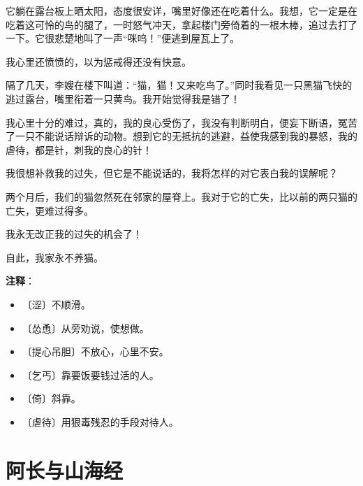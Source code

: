 \documentclass[12pt,UTF-8,openany]{ctexbook}
\begin{document}
\begin{large}
    它躺在露台板上晒太阳，态度很安详，嘴里好像还在吃着什么。我想，它一定是在吃着这可怜的鸟的腿了，一时怒气冲天，拿起楼门旁倚着的一根木棒，追过去打了一下。它很悲楚地叫了一声“咪呜！”便逃到屋瓦上了。
    
    我心里还愤愤的，以为惩戒得还没有快意。
    
    隔了几天，李嫂在楼下叫道：“猫，猫！又来吃鸟了。”同时我看见一只黑猫飞快的逃过露台，嘴里衔着一只黄鸟。我开始觉得我是错了！
    
    我心里十分的难过，真的，我的良心受伤了，我没有判断明白，便妄下断语，冤苦了一只不能说话辩诉的动物。想到它的无抵抗的逃避，益使我感到我的暴怒，我的虐待，都是针，刺我的良心的针！
    
    我很想补救我的过失，但它是不能说话的，我将怎样的对它表白我的误解呢？
    
    两个月后，我们的猫忽然死在邻家的屋脊上。我对于它的亡失，比以前的两只猫的亡失，更难过得多。
    
    我永无改正我的过失的机会了！
    
    自此，我家永不养猫。
    
\end{large}


\newpage

\textbf{注释}：

\vspace{-1em}

\begin{itemize}
    \setlength\itemsep{-0.2em}
    \item 〔涩〕不顺滑。
    \item 〔怂恿〕从旁劝说，使想做。
    \item 〔提心吊胆〕不放心，心里不安。
    \item 〔乞丐〕靠要饭要钱过活的人。
    \item 〔倚〕斜靠。
    \item 〔虐待〕用狠毒残忍的手段对待人。
\end{itemize}

\chapter{阿长与山海经}
\end{document}
